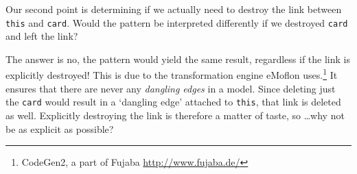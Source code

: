 Our second point is determining if we actually need to destroy the link between \texttt{this} and \texttt{card}. Would the pattern be interpreted differently if we
destroyed \texttt{card} and left the link?

The answer is no, the pattern would yield the same result, regardless if the link is explicitly destroyed!  This is due to the
transformation engine eMoflon uses.\footnote{CodeGen2, a part of Fujaba \url{http://www.fujaba.de/}} It ensures that there are never any \emph{dangling edges}
in a model. Since deleting just the \texttt{card} would result in a `dangling edge' attached to \texttt{this}, that link is deleted as well. Explicitly
destroying the link is therefore a matter of taste, so \ldots why not be as explicit as possible?





